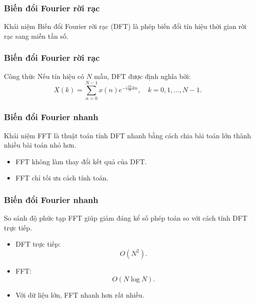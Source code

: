 \begin{frame}
  \frametitle{Biến đổi Fourier rời rạc}

  \begin{block}{Khái niệm}
    Biến đổi Fourier rời rạc (DFT) là phép biến đổi tín hiệu thời gian rời rạc
    sang miền tần số.
  \end{block}
\end{frame}

\begin{frame}
  \frametitle{Biến đổi Fourier rời rạc}
  \begin{block}{Công thức}
    Nếu tín hiệu có $N$ mẫu, DFT được định nghĩa bởi:
    \begin{equation}
      X(k)=\sum_{n=0}^{N-1}x(n)e^{-i\frac{2\pi}{N}kn},
      \quad k=0,1,\ldots,N-1.
    \end{equation}
  \end{block}
\end{frame}

\begin{frame}
  \frametitle{Biến đổi Fourier nhanh}

  \begin{block}{Khái niệm}
    FFT là thuật toán tính DFT nhanh bằng cách chia bài toán lớn thành
    nhiều bài toán nhỏ hơn.
  \end{block}

  \onslide<+->
  \begin{itemize}[<+->]
    \item FFT không làm thay đổi kết quả của DFT.
    \item FFT chỉ tối ưu cách tính toán.
  \end{itemize}
\end{frame}

\begin{frame}
  \frametitle{Biến đổi Fourier nhanh}

  \begin{block}{So sánh độ phức tạp}
    FFT giúp giảm đáng kể số phép toán so với cách tính DFT trực tiếp.
  \end{block}

  \onslide<+->
  \begin{itemize}[<+->]
    \item DFT trực tiếp:
      \begin{equation*}
        O(N^2).
      \end{equation*}

    \item FFT:
      \begin{equation*}
        O(N\log N).
      \end{equation*}

    \item Với dữ liệu lớn, FFT nhanh hơn rất nhiều.
  \end{itemize}
\end{frame}

